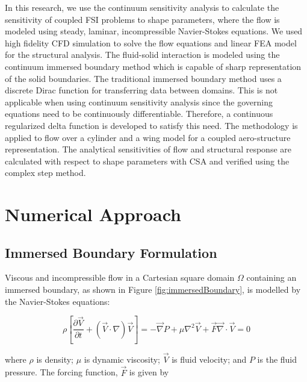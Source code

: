 \documentclass[12pt]{aiaa-pretty}
\begin{document}
In this research, we use the continuum sensitivity analysis to calculate the sensitivity of coupled FSI problems to shape parameters, where the flow is modeled using steady, laminar, incompressible Navier-Stokes equations. We used high fidelity CFD simulation to solve the flow equations and linear FEA model for the structural analysis. The fluid-solid interaction is modeled using the continuum immersed boundary method which is capable of sharp representation of the solid boundaries. The traditional immersed boundary method uses a discrete Dirac function for transferring data between domains. This is not applicable when using continuum sensitivity analysis since the governing equations need to be continuously differentiable. Therefore, a continuous regularized delta function is developed to satisfy this need. The methodology is applied to flow over a cylinder and a wing model for a coupled aero-structure representation. The analytical sensitivities of flow and structural response are calculated with respect to shape parameters with CSA and verified using the complex step method.

\section{Numerical Approach}
\subsection{Immersed Boundary Formulation}
Viscous and incompressible flow in a Cartesian square domain $\Omega$ containing an immersed boundary, as shown in Figure \eqref{fig:immersedBoundary}, is modelled by the Navier-Stokes equations:

%
\begin{subequations}\label{eq:NS}
\begin{equation}
	\rho \left[
	\frac{\partial \vec{V}}{\partial t} + 
	\left( \vec{V} \cdot \nabla \right) \vec{V}
	\right] = 
	-\vec{\nabla} P + \mu \nabla^2 \vec{V} + \vec{F}
\end{equation}
\begin{equation}
	\vec{\nabla} \cdot \vec{V} = 0
\end{equation}
\end{subequations}
%

where $\rho$ is density; $\mu$ is dynamic viscosity; $\vec{V}$ is fluid velocity; and $P$ is the fluid pressure. The forcing function, $\vec{F}$ is given by
\end{document}
